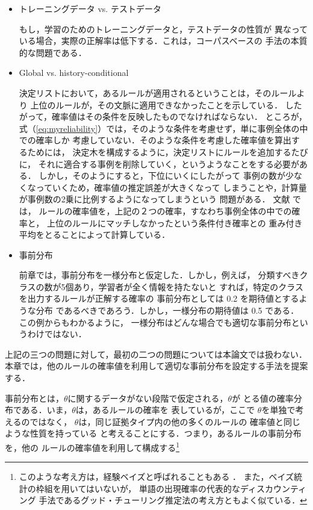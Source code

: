\begin{itemize}
\item トレーニングデータ vs. テストデータ

  もし，学習のためのトレーニングデータと，テストデータの性質が
異なっている場合，実際の正解率は低下する．これは，コーパスベースの
手法の本質的な問題である．

\item Global vs. history-conditional

 決定リストにおいて，あるルールが適用されるということは，そのルールより
上位のルールが，その文脈に適用できなかったことを示している．
したがって，確率値はその条件を反映したものでなければならない．
ところが，
式（\ref{eq:myreliability}）では，そのような条件を考慮せず，単に事例全体の中での確率しか
考慮していない．そのような条件を考慮した確率値を算出するためには，
決定木を構成するように，決定リストにルールを追加するたびに，
それに適合する事例を削除していく，というようなことをする必要がある．
しかし，そのようにすると，下位にいくにしたがって
事例の数が少なくなっていくため，確率値の推定誤差が大きくなって
しまうことや，計算量が事例数の2乗に比例するようになってしまうという
問題がある．
文献 \cite{Yarowsky:Hierarchical}では，
ルールの確率値を，上記の２つの確率，すなわち事例全体の中での確率と，
上位のルールにマッチしなかったという条件付き確率との
重み付き平均をとることによって計算している．


\item 事前分布

 前章では，事前分布を一様分布と仮定した．しかし，例えば，
分類すべきクラスの数が5個あり，学習者が全く情報を持たないと
すれば，特定のクラスを出力するルールが正解する確率の
事前分布としては 0.2 を期待値とするような分布
であるべきであろう．しかし，一様分布の期待値は 0.5 である．
この例からもわかるように，
一様分布はどんな場合でも適切な事前分布というわけではない．

\end{itemize}

上記の三つの問題に対して，最初の二つの問題については本論文では扱わない．
本章では，他のルールの確率値を利用して適切な事前分布を設定する手法を提案する．





\vspace{-0.5mm}
事前分布とは，$\theta$に関するデータがない段階で仮定される，$\theta$が
とる値の確率分布である．いま，$\theta$は，あるルールの確率を
表しているが，ここで $\theta$を単独で考えるのではなく，
$\theta$は，同じ証拠タイプ内の他の多くのルールの
確率値と同じような性質を持っている
と考えることにする．つまり，あるルールの事前分布を，他の
ルールの確率値を利用して構成する\footnote{
このような考え方は，経験ベイズと呼ばれることもある \cite{gelman:bayesian}．
また，ベイズ統計の枠組を用いてはいないが，
単語の出現確率の代表的なディスカウンティング
手法であるグッド・チューリング推定法の考え方ともよく似ている\cite{北:確率的}．}

